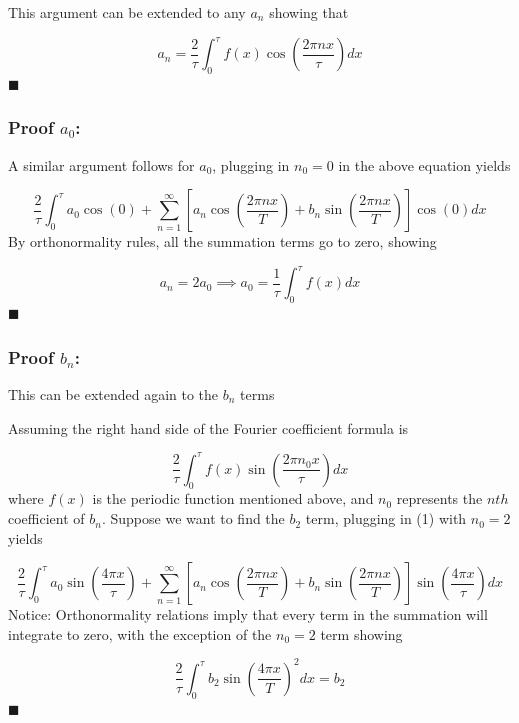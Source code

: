 \documentclass{article}
\begin{document}
This argument can be extended to any $a_n$ showing that 

\begin{equation*}
	a_{n}=\frac{2}{\tau} \int_{0}^{\tau} f(x)\cos(\frac{2\pi nx}{\tau}) dx
\end{equation*}
$\blacksquare$ 
\subsubsection{Proof $a_0$: }
A similar argument follows for $a_0$, plugging in $n_0 = 0$ in the above equation yields 

\begin{equation*}
	\frac{2}{\tau} \int_{0}^{\tau} 
    a_{0} \cos(0)+\sum_{n=1}^{\infty} [a_{n} \cos(\frac{2\pi nx}{T})+b_{n} \sin(\frac{2\pi nx}{T})] \cos(0) dx
\end{equation*}
By orthonormality rules, all the summation terms go to zero, showing

\begin{equation*}
	a_n = 2a_0 \implies  a_{0}=\frac{1}{\tau} \int_{0}^{\tau} f(x) dx
\end{equation*}$\blacksquare$ 
\subsubsection{Proof $b_n$:}
This can be extended again to the $b_n$ terms 

Assuming the right hand side of the Fourier coefficient formula is 

\begin{equation*}
	\frac{2}{\tau} \int_{0}^{\tau} f(x)\sin(\frac{2\pi n_{0}x}{\tau}) dx
\end{equation*}
where $f(x)$ is the periodic function mentioned above, and $n_0$ represents the $nth$ coefficient of $b_n$. Suppose we want to find the $b_2$ term, plugging in (1) with $n_0 = 2$ yields

\begin{equation*}
	\frac{2}{\tau} \int_{0}^{\tau} 
    a_{0} \sin(\frac{4\pi x}{\tau})+\sum_{n=1}^{\infty} [a_{n} \cos(\frac{2\pi nx}{T})+b_{n} \sin(\frac{2\pi nx}{T})] \sin(\frac{4\pi x}{\tau}) dx
\end{equation*}
Notice: Orthonormality relations imply that every term in the summation will integrate to zero, with the exception of the $n_0 = 2$ term showing

\begin{equation*}
	\frac{2}{\tau} \int_{0}^{\tau} b_{2}\sin(\frac{4\pi x} {T})^2 dx = b_2\end{equation*}
$\blacksquare$ 
\end{document}
